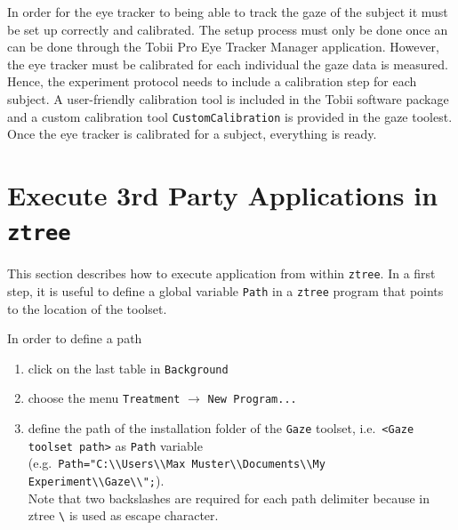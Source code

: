 \documentclass[a4paper,oneside]{book}
\begin{document}
In order for the eye tracker to being able to track the gaze of the subject it must be set up correctly and calibrated.
The setup process must only be done once an can be done through the Tobii Pro Eye Tracker Manager application.
However, the eye tracker must be calibrated for each individual the gaze data is measured.
Hence, the experiment protocol needs to include a calibration step for each subject.
A user-friendly calibration tool is included in the Tobii software package and a custom calibration tool \texttt{CustomCalibration} is provided in the gaze toolest.
Once the eye tracker is calibrated for a subject, everything is ready.

\section{Execute 3rd Party Applications in \texttt{ztree}}
\label{sec.external.ztree}
This section describes how to execute application from within \texttt{ztree}.
In a first step, it is useful to define a global variable \texttt{Path} in a \texttt{ztree} program that points to the location of the toolset.

In order to define a path
\begin{enumerate}
    \item click on the last table in \texttt{Background}
    \item choose the menu \texttt{Treatment} $\rightarrow$ \texttt{New Program...}
    \item define the path of the installation folder of the \texttt{Gaze} toolset, i.e.~\texttt{<Gaze toolset path>} as \texttt{Path} variable\\
        (e.g.~\texttt{Path="C:\textbackslash\textbackslash Users\textbackslash\textbackslash Max Muster\textbackslash\textbackslash Documents\textbackslash\textbackslash My Experiment\textbackslash\textbackslash Gaze\textbackslash\textbackslash";}). \\
        Note that two backslashes are required for each path delimiter because in ztree \texttt{\textbackslash} is used as escape character.
\end{enumerate}
\end{document}
